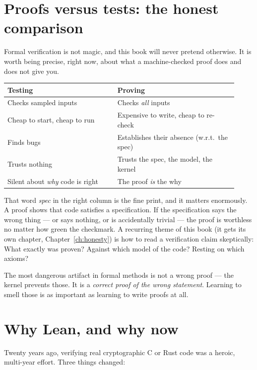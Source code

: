 \section{Proofs versus tests: the honest comparison}

Formal verification is not magic, and this book will never pretend otherwise.
It is worth being precise, right now, about what a machine-checked proof does
and does not give you.

\begin{center}
\begin{tabular}{@{}p{0.44\linewidth}p{0.48\linewidth}@{}}
\toprule
\textbf{Testing} & \textbf{Proving} \\
\midrule
Checks sampled inputs & Checks \emph{all} inputs \\
Cheap to start, cheap to run & Expensive to write, cheap to re-check \\
Finds bugs & Establishes their absence (w.r.t.\ the spec) \\
Trusts nothing & Trusts the spec, the model, the kernel \\
Silent about \emph{why} code is right & The proof \emph{is} the why \\
\bottomrule
\end{tabular}
\end{center}

That word \emph{spec} in the right column is the fine print, and it matters
enormously. A proof shows that code satisfies a specification. If the
specification says the wrong thing --- or says nothing, or is accidentally
trivial --- the proof is worthless no matter how green the checkmark. A
recurring theme of this book (it gets its own chapter,
Chapter~\ref{ch:honesty}) is how to read a verification claim skeptically:
What exactly was proven? Against which model of the code? Resting on which
axioms?

\begin{aha}
The most dangerous artifact in formal methods is not a wrong proof --- the
kernel prevents those. It is a \emph{correct proof of the wrong statement}.
Learning to smell those is as important as learning to write proofs at all.
\end{aha}

\section{Why Lean, and why now}

Twenty years ago, verifying real cryptographic C or Rust code was a heroic,
multi-year effort. Three things changed:


